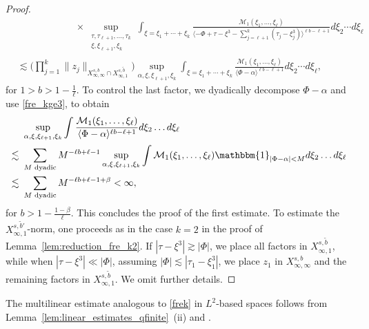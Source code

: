 \documentclass[a4paper,
11pt,  reqno]{amsart}
\newcommand{\fia}{\mathbbm{1}_{|\Phi-\alpha|<M}}
\newcommand{\jap}[1]{\langle #1 \rangle}
\newcommand{\5}{\textup{V}}
\newcommand{\les}{\lesssim}
\newcommand{\wt}{\widetilde}
\theoremstyle{remark}
\newcommand{\be}{\beta}
\renewcommand{\l}{\ell}
\newcommand{\ges}{\gtrsim}
\numberwithin{equation}{section}
\numberwithin{theorem}{section}
\begin{document}
\begin{proof}
\begin{align*}
                & \qquad \qquad \qquad \times
                \sup_{\substack{\tau, \tau_{\ell+1},\dots,\tau_k\\ \xi, \xi_{\ell+1}, \xi_k}} \int_{\xi = \xi_1 + \cdots + \xi_k} \frac{ \mathcal{M}_1(\xi_1, \ldots, \xi_\l)
                }{ \jap{- \Phi + \tau-\xi^3 - \sum_{j=\ell+1}^k (\tau_j-\xi_j^3)}^{\ell b - \ell +1}} d\xi_2\cdots d\xi_\ell  \\
                &
                \les
                \bigg(\prod_{j=1}^k \|z_j\|_{X_{\infty,\infty}^{s,b} \cap X^{s, \wt b}_{\infty, 1}}
                \bigg)
                \sup_{{\alpha,  \xi, \xi_{\ell+1}, \xi_k}} \int_{\xi = \xi_1 + \cdots + \xi_k}  \frac{\mathcal{M}_1(\xi_1, \ldots, \xi_\l)}{ \jap{\Phi -\alpha}^{\ell b - \ell +1}} d\xi_2\cdots d\xi_\ell
                ,
			\end{align*}
for $1>b> 1- \frac1\l$.
			To control the last factor, we dyadically decompose  $\Phi-\alpha$ and use \eqref{fre_kge3}, to obtain
			\begin{align*}
				&\sup_{{\alpha,  \xi, \xi_{\ell+1}, \xi_k}} \int  \frac{\mathcal{M}_1(\xi_1, \ldots, \xi_\l)}{ \jap{\Phi -\alpha}^{\ell b - \ell +1}} d\xi_2\dots d\xi_\ell \\\lesssim\ & \sum_{M \text{ dyadic}} M^{-\ell b +\ell-1} \sup_{{\alpha,  \xi, \xi_{\ell+1}, \xi_k}} \int \mathcal{M}_1(\xi_1, \ldots, \xi_\l) \fia d\xi_2\dots d\xi_\ell \\\lesssim\ & \sum_{M \text{ dyadic}} M^{-\ell b +\ell-1+\beta} <\infty,
			\end{align*}
            for $b > 1 - \frac{1-\be}{\l}$.
			This concludes the proof of the first estimate. To estimate the $X^{s, \wt b'}_{\infty,1}$-norm, one proceeds as in the case $k=2$ in the proof of Lemma~\ref{lem:reduction_fre_k2}.
            {If $|\tau - \xi^3| \ges |\Phi|$, we place all factors in $X^{s, \wt b}_{\infty, 1}$, while when $|\tau-\xi^3| \ll |\Phi|$, assuming $|\Phi| \les |\tau_1-\xi_1^3|$, we place $z_1$ in $X^{s, b}_{\infty, \infty}$ and the remaining factors in $X^{s, \wt b}_{\infty, 1}$. We omit further details.}
\qedhere


		\end{proof}


        The multilinear estimate analogous to \eqref{frek} in $L^2$-based spaces follows from
        Lemma~\ref{lem:linear_estimates_qfinite}~(ii) and \cite[Lemma 2]{COS}.
\end{document}
